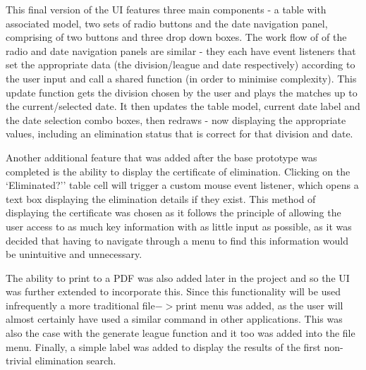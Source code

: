 This final version of the UI features three main components - a table with
associated model,  two sets of radio buttons and the date navigation panel,
comprising of two buttons and three drop down boxes. The work flow of of the
radio and date navigation panels are similar - they each have event listeners
that set the appropriate data (the division/league and date respectively)
according to the user input and call a shared function  (in order to minimise
complexity). This update function gets the division chosen by the user and plays
the matches up to the current/selected date. It then updates the table model,
current date label and the date selection combo boxes, then redraws - now
displaying the appropriate values, including an elimination status that is
correct for that division and date. 

Another additional feature that was added after the base prototype was completed
is the ability to display the certificate of elimination. Clicking on the 
`Eliminated?'' table cell will trigger a custom mouse event listener, which opens
a  text box displaying the elimination details if they exist. This method of 
displaying the certificate was chosen as it follows the principle of allowing 
the user access to as much key information with as little input as possible, 
as it was decided that having to navigate through a menu to find this information
would be unintuitive and unnecessary. 

The ability to print to a PDF was also added later in the project and so the UI was
further extended to incorporate this. Since this functionality will be used infrequently
a more traditional file$-$$>$print menu was added, as the user will almost certainly
have used a similar command in other applications. This was also the case with the 
generate league function and it too was added into the file menu. Finally, a simple 
label was added to display the results of the first non-trivial elimination search.
